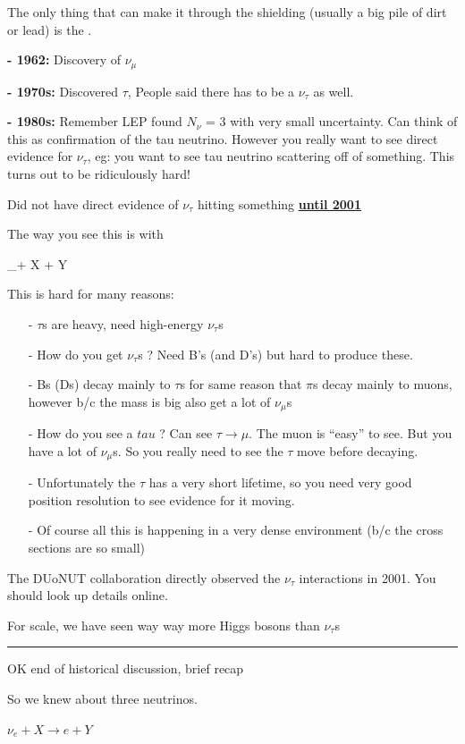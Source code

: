 {The only thing that can make it through the shielding (usually a big pile of dirt or lead) is the \nus.

\textbf{- 1962:} Discovery of $\nu_\mu$

\textbf{- 1970s:} Discovered $\tau$, People said there has to be a $\nu_\tau$ as well. 

\textbf{- 1980s:} Remember LEP found $N_\nu$ = 3 with very small uncertainty.  
Can think of this as confirmation of the tau neutrino.  
However you really want to see direct evidence for $\nu_\tau$, eg: you want to see tau neutrino scattering off of something. 
This turns out to be ridiculously hard! 

Did not have direct evidence of $\nu_\tau$ hitting something \textbf{\underline{until 2001}}


The way you see this is with

\be
\nu_\tau + X \rightarrow \tau + Y 
\ee

This is hard for many reasons:
\begin{itemize}
\item[-] $\tau$s are heavy, need high-energy $\nu_\tau$s
\item[-] How do you get $\nu_\tau$s ? Need B's (and D's) but hard to produce these. 
\item[-] Bs (Ds) decay mainly to $\tau$s for same reason that $\pi$s decay mainly to muons, however b/c the mass is big also get a lot of $\nu_\mu$s
\item[-] How do you see a  $tau$ ? Can see $\tau \rightarrow \mu$. The muon is ``easy'' to see. But you have a lot of $\nu_\mu$s. So you really need to see the $\tau$ move before decaying.
\item[-] Unfortunately the $\tau$ has a very short lifetime, so you need very good position resolution to see evidence for it moving. 
\item[-] Of course all this is happening in a very dense environment (b/c the cross sections are so small) 
\end{itemize}

The DUoNUT collaboration directly observed the $\nu_\tau$ interactions in 2001. 
You should look up details online. 

For scale, we have seen way way more Higgs bosons than $\nu_\tau$s

\noindent\rule{\textwidth}{1pt}

OK end of historical discussion, brief recap

So we knew about three neutrinos. 
\begin{center}
$\nu_e + X  \rightarrow e + Y $


\end{center}}
